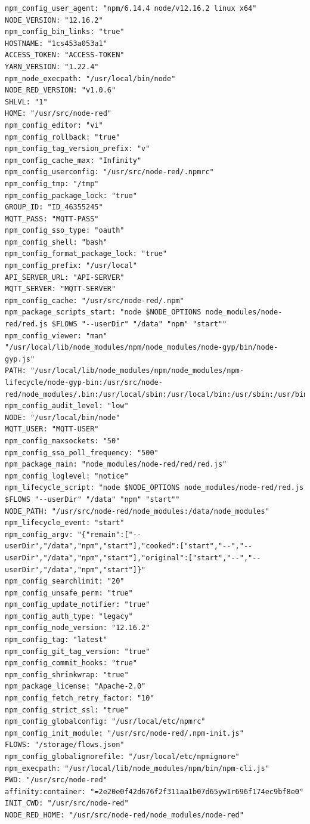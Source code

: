 \documentclass[a4paper,10pt]{memoir}
\begin{document}
\begin{lstlisting}
npm_config_user_agent: "npm/6.14.4 node/v12.16.2 linux x64"
NODE_VERSION: "12.16.2"
npm_config_bin_links: "true"
HOSTNAME: "1cs453a053a1"
ACCESS_TOKEN: "ACCESS-TOKEN"
YARN_VERSION: "1.22.4"
npm_node_execpath: "/usr/local/bin/node"
NODE_RED_VERSION: "v1.0.6"
SHLVL: "1"
HOME: "/usr/src/node-red"
npm_config_editor: "vi"
npm_config_rollback: "true"
npm_config_tag_version_prefix: "v"
npm_config_cache_max: "Infinity"
npm_config_userconfig: "/usr/src/node-red/.npmrc"
npm_config_tmp: "/tmp"
npm_config_package_lock: "true"
GROUP_ID: "ID_46355245"
MQTT_PASS: "MQTT-PASS"
npm_config_sso_type: "oauth"
npm_config_shell: "bash"
npm_config_format_package_lock: "true"
npm_config_prefix: "/usr/local"
API_SERVER_URL: "API-SERVER"
MQTT_SERVER: "MQTT-SERVER"
npm_config_cache: "/usr/src/node-red/.npm"
npm_package_scripts_start: "node $NODE_OPTIONS node_modules/node-red/red.js $FLOWS "--userDir" "/data" "npm" "start""
npm_config_viewer: "man" "/usr/local/lib/node_modules/npm/node_modules/node-gyp/bin/node-gyp.js"
PATH: "/usr/local/lib/node_modules/npm/node_modules/npm-lifecycle/node-gyp-bin:/usr/src/node-red/node_modules/.bin:/usr/local/sbin:/usr/local/bin:/usr/sbin:/usr/bin:/sbin:/bin"
npm_config_audit_level: "low"
NODE: "/usr/local/bin/node"
MQTT_USER: "MQTT-USER"
npm_config_maxsockets: "50"
npm_config_sso_poll_frequency: "500"
npm_package_main: "node_modules/node-red/red/red.js"
npm_config_loglevel: "notice"
npm_lifecycle_script: "node $NODE_OPTIONS node_modules/node-red/red.js $FLOWS "--userDir" "/data" "npm" "start""
NODE_PATH: "/usr/src/node-red/node_modules:/data/node_modules"
npm_lifecycle_event: "start"
npm_config_argv: "{"remain":["--userDir","/data","npm","start"],"cooked":["start","--","--userDir","/data","npm","start"],"original":["start","--","--userDir","/data","npm","start"]}"
npm_config_searchlimit: "20"
npm_config_unsafe_perm: "true"
npm_config_update_notifier: "true"
npm_config_auth_type: "legacy"
npm_config_node_version: "12.16.2"
npm_config_tag: "latest"
npm_config_git_tag_version: "true"
npm_config_commit_hooks: "true"
npm_config_shrinkwrap: "true"
npm_package_license: "Apache-2.0"
npm_config_fetch_retry_factor: "10"
npm_config_strict_ssl: "true"
npm_config_globalconfig: "/usr/local/etc/npmrc"
npm_config_init_module: "/usr/src/node-red/.npm-init.js"
FLOWS: "/storage/flows.json"
npm_config_globalignorefile: "/usr/local/etc/npmignore"
npm_execpath: "/usr/local/lib/node_modules/npm/bin/npm-cli.js"
PWD: "/usr/src/node-red"
affinity:container: "=2e20e0f42d676f2f311aa1b07d65yw1r696f174ec9bf8e0"
INIT_CWD: "/usr/src/node-red"
NODE_RED_HOME: "/usr/src/node-red/node_modules/node-red"
\end{lstlisting}
\end{document}
